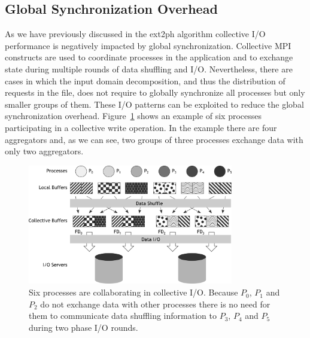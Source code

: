 \subsection{Global Synchronization Overhead}
As we have previously discussed in the ext2ph algorithm collective I/O performance is negatively impacted by global synchronization. Collective MPI constructs are used to coordinate processes
in the application and to exchange state during multiple rounds of data shuffling and I/O. Nevertheless, there are cases in which the input domain decomposition, and thus the distribution
of requests in the file, does not require to globally synchronize all processes but only smaller groups of them. These I/O patterns can be exploited to reduce the global synchronization overhead.
Figure~\ref{figure: parcol} shows an example of six processes participating in a collective write operation. In the example there are four aggregators and, as we can see, two groups of three processes
exchange data with only two aggregators.

\begin{figure}[!htb]
  \centering
  \includegraphics[width=0.8\textwidth]{figures/parcoll}
  \caption{Six processes are collaborating in collective I/O. Because $P_0$, $P_1$ and $P_2$ do not exchange data with other processes there is no need for them to communicate data shuffling information
  to $P_3$, $P_4$ and $P_5$ during two phase I/O rounds.}
  \label{figure: parcol}
\end{figure}


